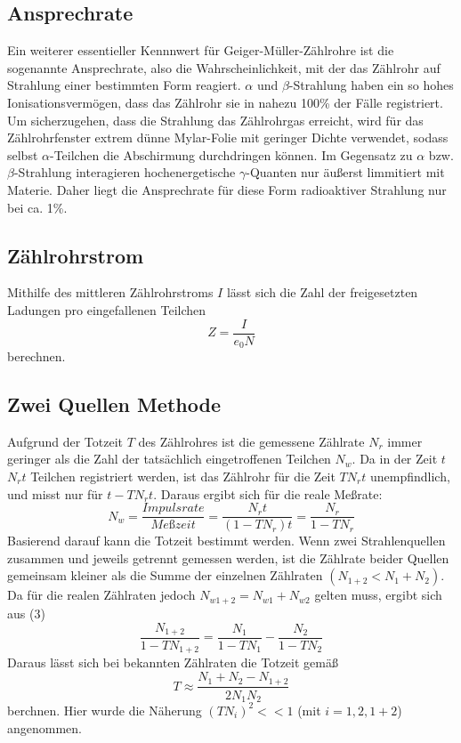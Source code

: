 \subsection{Ansprechrate}
Ein weiterer essentieller Kennnwert für Geiger-Müller-Zählrohre ist die sogenannte Ansprechrate, also die Wahrscheinlichkeit, mit der das Zählrohr auf Strahlung einer bestimmten Form reagiert. $\alpha$ und $\beta$-Strahlung haben ein so hohes Ionisationsvermögen, dass das Zählrohr sie in nahezu 100\% der Fälle registriert. Um sicherzugehen, dass die Strahlung das Zählrohrgas erreicht, wird für das Zählrohrfenster extrem dünne Mylar-Folie mit geringer Dichte verwendet, sodass selbst $\alpha$-Teilchen die Abschirmung durchdringen können. Im Gegensatz zu $\alpha$ bzw. $\beta$-Strahlung interagieren hochenergetische $\gamma$-Quanten nur äußerst limmitiert mit Materie. Daher liegt die Ansprechrate für diese Form radioaktiver Strahlung nur bei ca. 1\%.
\subsection{Zählrohrstrom}
Mithilfe des mittleren Zählrohrstroms $I$ lässt sich die Zahl der freigesetzten Ladungen pro eingefallenen Teilchen 
\begin{equation}
    \label{eq:zaehlrohrstrom}
Z=\frac{I}{e_0N}
\end{equation}
berechnen. 
\subsection{Zwei Quellen Methode}
Aufgrund der Totzeit $T$ des Zählrohres ist die gemessene Zählrate $N_r$ immer geringer als die Zahl der tatsächlich eingetroffenen Teilchen $N_w$. Da in der Zeit $t$ $N_rt$ Teilchen registriert werden, ist das Zählrohr für die Zeit $TN_rt$ unempfindlich, und misst nur für $t-TN_rt$. Daraus ergibt sich für die reale Meßrate:
\begin{equation}
N_w=\frac{Impulsrate}{Meßzeit}=\frac{N_rt}{(1-TN_r)t}=\frac{N_r}{1-TN_r}
\end{equation}
Basierend darauf kann die Totzeit bestimmt werden. Wenn zwei Strahlenquellen zusammen und jeweils getrennt gemessen werden, ist die Zählrate beider Quellen gemeinsam kleiner als die Summe der einzelnen Zählraten $(N_{1+2}<N_1+N_2)$. Da für die realen Zählraten jedoch $N_{w1+2}=N_{w1}+N_{w2}$ gelten muss, ergibt sich aus (3)
\begin{equation}
\frac{N_{1+2}}{1-TN_{1+2}}=\frac{N_1}{1-TN_1}-\frac{N_2}{1-TN_2}
\end{equation}
Daraus lässt sich bei bekannten Zählraten die Totzeit gemäß
\begin{equation}
    \label{eq:totzeit}
T\approx\frac{N_1+N_2-N_{1+2}}{2N_1N_2}
\end{equation}
berchnen. Hier wurde die Näherung $(TN_i)^2<<1$ (mit $i=1,2,1+2$) angenommen. 
